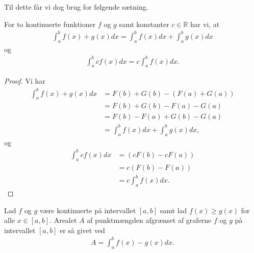 Til dette får vi dog brug for følgende sætning.
\newpage
\begin{setn}
	\label{setn:hjælp}
	For to kontinuerte funktioner $f$ og $g$ samt konstanter $c \in \mathbb{R}$ har vi, at 
	\begin{align*}
		\int_a^bf(x) + g(x) dx = \int_a^b f(x) dx + \int_a^b g(x) dx
	\end{align*}
	og
	\begin{align*}
		\int_a^b cf(x) dx = c\int_a^b f(x) dx.
	\end{align*}
\end{setn}
\begin{proof}
	Vi har
	\begin{align*}
		\int_a^b f(x) + g(x) dx &= F(b) + G(b) -(F(a) + G(a)) \\
		&= F(b) + G(b) - F(a) - G(a) \\
		&= F(b) - F(a) + G(b) - G(a) \\
		&= \int_a^b f(x) dx + \int_a^b g(x) dx, 
	\end{align*}
	og 
	\begin{align*}
		\int_a^b cf(x) dx &= (cF(b)-cF(a)) \\
		 &= c(F(b)-F(a)) \\
		 &= c\int_a^b f(x) dx.
	\end{align*}
\end{proof}
\begin{setn}\label{setn:hovedsætn}
	Lad $f$ og $g$ være kontinuerte på intervallet $[a,b]$ samt lad $f(x) \geq g(x)$ for alle $x \in [a,b]$. Arealet $A$ af
	punktmængden afgrænset af graferne $f$ og $g$ på intervallet $[a,b]$ er så givet ved
	\begin{align*}
		A = \int_a^b f(x) - g(x) dx.	
	\end{align*}	 
\end{setn}
